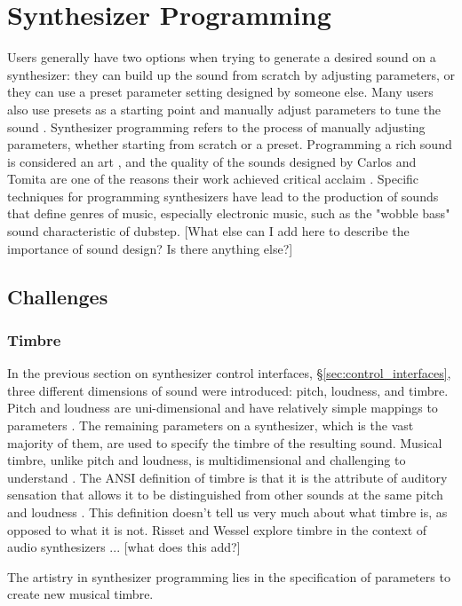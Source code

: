 \section{Synthesizer Programming}
Users generally have two options when trying to generate a desired sound on a synthesizer: they can build up the sound from scratch by adjusting parameters, or they can use a preset parameter setting designed by someone else. Many users also use presets as a starting point and manually adjust parameters to tune the sound \cite{krekovic2019insights}. Synthesizer programming refers to the process of manually adjusting parameters, whether starting from scratch or a preset. Programming a rich sound is considered an art \cite{russ2012sound}, and the quality of the sounds designed by Carlos and Tomita are one of the reasons their work achieved critical acclaim \cite{jenkins2019analog}. Specific techniques for programming synthesizers have lead to the production of sounds that define genres of music, especially electronic music, such as the "wobble bass" sound characteristic of dubstep. [What else can I add here to describe the importance of sound design? Is there anything else?]

\subsection{Challenges}
\subsubsection{Timbre}
In the previous section on synthesizer control interfaces, \S\ref{sec:control_interfaces}, three different dimensions of sound were introduced: pitch, loudness, and timbre. Pitch and loudness are uni-dimensional and have relatively simple mappings to parameters \cite{seago2004critical}. The remaining parameters on a synthesizer, which is the vast majority of them, are used to specify the timbre of the resulting sound. Musical timbre, unlike pitch and loudness, is multidimensional and challenging to understand \cite{krumhansl1989musical}. The ANSI definition of timbre is that it is the attribute of auditory sensation that allows it to be distinguished from other sounds at the same pitch and loudness \cite{american1973american}. This definition doesn't tell us very much about what timbre is, as opposed to what it is not. Risset and Wessel \cite{risset1999exploration} explore timbre in the context of audio synthesizers ... [what does this add?]

The artistry in synthesizer programming lies in the specification of parameters to create new musical timbre.

